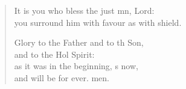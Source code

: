 \begin{verse}
\begin{patverse}
It is you who bless the just mn, Lord:\Med\\
    you surround him with favour as with  shield.

Glory to the Father and to th Son,\Med\\
    and to the Hol Spirit:\\
as it was in the beginning, \pointup{\i}s now,\Med\\
    and will be for ever. men.
  \end{patverse}
\end{verse}
